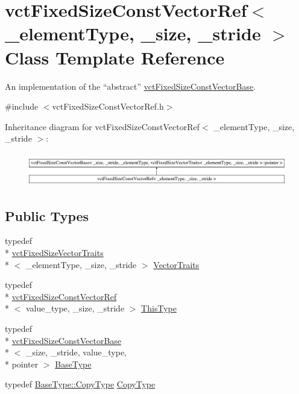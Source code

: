 \hypertarget{classvct_fixed_size_const_vector_ref}{\section{vct\-Fixed\-Size\-Const\-Vector\-Ref$<$ \-\_\-element\-Type, \-\_\-size, \-\_\-stride $>$ Class Template Reference}
\label{classvct_fixed_size_const_vector_ref}
}


An implementation of the ``abstract'' \hyperlink{classvct_fixed_size_const_vector_base}{vct\-Fixed\-Size\-Const\-Vector\-Base}.  




{\ttfamily \#include $<$vct\-Fixed\-Size\-Const\-Vector\-Ref.\-h$>$}

Inheritance diagram for vct\-Fixed\-Size\-Const\-Vector\-Ref$<$ \-\_\-element\-Type, \-\_\-size, \-\_\-stride $>$\-:\begin{figure}[H]
\begin{center}
\leavevmode
\includegraphics[height=1.475626cm]{d0/dd6/classvct_fixed_size_const_vector_ref}
\end{center}
\end{figure}
\subsection*{Public Types}
\begin{DoxyCompactItemize}
\item 
typedef \\*
\hyperlink{classvct_fixed_size_vector_traits}{vct\-Fixed\-Size\-Vector\-Traits}\\*
$<$ \-\_\-element\-Type, \-\_\-size, \-\_\-stride $>$ \hyperlink{classvct_fixed_size_const_vector_ref_a3babba555c9429381db7df666b708aca}{Vector\-Traits}
\item 
typedef \\*
\hyperlink{classvct_fixed_size_const_vector_ref}{vct\-Fixed\-Size\-Const\-Vector\-Ref}\\*
$<$ value\-\_\-type, \-\_\-size, \-\_\-stride $>$ \hyperlink{classvct_fixed_size_const_vector_ref_a21e7349968a7377aaeacacf7803e05e6}{This\-Type}
\item 
typedef \\*
\hyperlink{classvct_fixed_size_const_vector_base}{vct\-Fixed\-Size\-Const\-Vector\-Base}\\*
$<$ \-\_\-size, \-\_\-stride, value\-\_\-type, \\*
pointer $>$ \hyperlink{classvct_fixed_size_const_vector_ref_a669fc6db8058bda695431756ce54f59d}{Base\-Type}
\item 
typedef \hyperlink{classvct_fixed_size_const_vector_base_aaf3accb7cec5765478b5d8fa39c22408}{Base\-Type\-::\-Copy\-Type} \hyperlink{classvct_fixed_size_const_vector_ref_a14ea8a2cf943f5a4f5f9d2def5ce48de}{Copy\-Type}
\end{DoxyCompactItemize}
